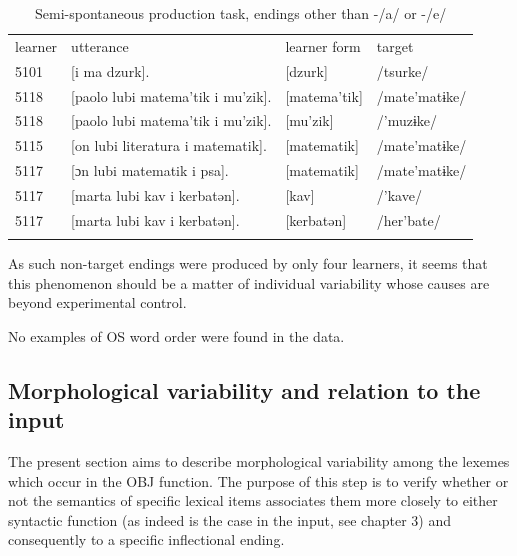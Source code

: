 \begin{table}
    \begin{tabularx}{\textwidth}{llll}
        \lsptoprule
        learner & utterance & learner form & target\\
        5101 & [i ma dzurk]. & [dzurk] & /tsurke/\\
        5118 & [paolo lubi matema'tik i mu'zik]. & [matema'tik] & /mate'matɨke/\\
        5118 & [paolo lubi matema'tik i mu'zik]. & [mu'zik] & /'muzɨke/\\
        5115 & [on lubi literatura i matematik]. & [matematik] & /mate'matɨke/\\
        5117 & [ɔn lubi matematik i psa]. & [matematik] & /mate'matɨke/\\
        5117 & [marta lubi kav i kerbatən]. & [kav] & /'kave/\\
        5117 & [marta lubi kav i kerbatən]. & [kerbatən] & /her'bate/\\
        \lspbottomrule
    \end{tabularx}
    \caption{Semi-spontaneous production task, endings other than -/a/ or -/e/}
    \label{tab:07:1}
\end{table}

As such non-target endings were produced by only four learners, it seems that this phenomenon should be a matter of individual variability whose causes are beyond experimental control. 

No examples of OS word order were found in the data. 

\subsection{Morphological variability and relation to the input}\label{sec:07:2.1}

The present section aims to describe morphological variability among the lexemes which occur in the OBJ function. The purpose of this step is to verify whether or not the semantics of specific lexical items associates them more closely to either syntactic function (as indeed is the case in the input, see chapter 3) and consequently to a specific inflectional ending. 

